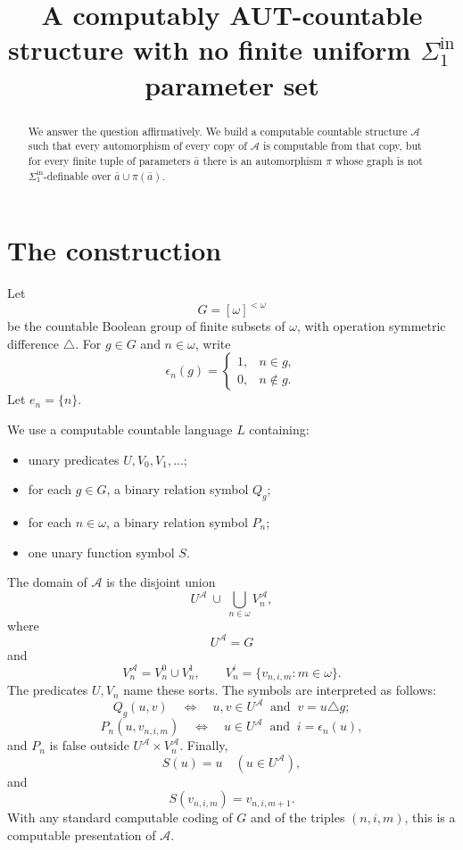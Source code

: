 \documentclass[11pt]{article}
\begin{document}
\title{A computably AUT-countable structure with no finite uniform
$\Sigma^{\mathrm{in}}_1$ parameter set}
\author{}
\date{}
\maketitle

\begin{abstract}
We answer the question affirmatively.  We build a computable countable
structure $\mathcal A$ such that every automorphism of every copy of
$\mathcal A$ is computable from that copy, but for every finite tuple of
parameters $\bar a$ there is an automorphism $\pi$ whose graph is not
$\Sigma^{\mathrm{in}}_1$-definable over $\bar a\cup\pi(\bar a)$.
\end{abstract}

\section*{The construction}

Let
\[
G=[\omega]^{<\omega}
\]
be the countable Boolean group of finite subsets of $\omega$, with operation
symmetric difference $\triangle$.  For $g\in G$ and $n\in\omega$, write
\[
\epsilon_n(g)=
\begin{cases}
1,& n\in g,\\
0,& n\notin g.
\end{cases}
\]
Let $e_n=\{n\}$.

We use a computable countable language $L$ containing:
\begin{itemize}
\item unary predicates $U,V_0,V_1,\dots$;
\item for each $g\in G$, a binary relation symbol $Q_g$;
\item for each $n\in\omega$, a binary relation symbol $P_n$;
\item one unary function symbol $S$.
\end{itemize}

The domain of $\mathcal A$ is the disjoint union
\[
U^{\mathcal A}\ \cup\ \bigcup_{n\in\omega}V_n^{\mathcal A},
\]
where
\[
U^{\mathcal A}=G
\]
and
\[
V_n^{\mathcal A}=V_n^0\cup V_n^1,\qquad
V_n^i=\{v_{n,i,m}:m\in\omega\}.
\]
The predicates $U,V_n$ name these sorts.  The symbols are interpreted as follows:
\[
Q_g(u,v)\quad\Longleftrightarrow\quad u,v\in U^{\mathcal A}
\ \text{ and }\ v=u\triangle g;
\]
\[
P_n(u,v_{n,i,m})\quad\Longleftrightarrow\quad
u\in U^{\mathcal A}\ \text{ and }\ i=\epsilon_n(u),
\]
and $P_n$ is false outside $U^{\mathcal A}\times V_n^{\mathcal A}$.  Finally,
\[
S(u)=u\quad(u\in U^{\mathcal A}),
\]
and
\[
S(v_{n,i,m})=v_{n,i,m+1}.
\]
With any standard computable coding of $G$ and of the triples $(n,i,m)$, this is a computable presentation of $\mathcal A$.
\end{document}
